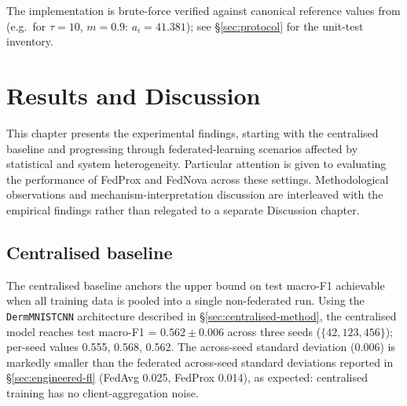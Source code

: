 \documentclass[11pt,a4paper]{report}  %
\begin{document}
The implementation is brute-force verified against canonical reference
values from \citet{wang2020fednova} (e.g.\ for $\tau = 10$, $m = 0.9$:
$a_i = 41.381$); see §\ref{sec:protocol} for the unit-test inventory.

\chapter{Results and Discussion}
\label{ch:results}

This chapter presents the experimental findings, starting with the
centralised baseline and progressing through federated-learning
scenarios affected by statistical and system heterogeneity. Particular
attention is given to evaluating the performance of FedProx and
FedNova across these settings. Methodological observations and
mechanism-interpretation discussion are interleaved with the
empirical findings rather than relegated to a separate Discussion
chapter.

\section{Centralised baseline}
\label{sec:centralised-results}


The centralised baseline anchors the upper bound on test macro-F1
achievable when all training data is pooled into a single non-federated
run. Using the \texttt{DermMNISTCNN} architecture described in
§\ref{sec:centralised-method}, the centralised model reaches test
macro-F1 = $\mathbf{0.562 \pm 0.006}$ across three seeds
($\{42, 123, 456\}$); per-seed values 0.555, 0.568, 0.562. The
across-seed standard deviation (0.006) is markedly smaller than the
federated across-seed standard deviations reported in
§\ref{sec:engineered-fl} (FedAvg 0.025, FedProx 0.014), as expected:
centralised training has no client-aggregation noise.

\end{document}
